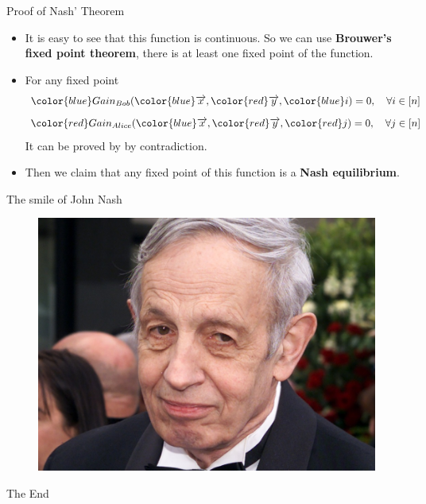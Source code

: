 \documentclass{beamer}
\begin{document}
\begin{frame}[fragile]{Proof of Nash' Theorem}
	\begin{itemize}[<+->]
		\item It is easy to see that this function is continuous. So we can use \textbf{Brouwer’s fixed point theorem}, there is at least one fixed point of the function.
		\item For any fixed point 
		\begin{equation}
		{\color{blue}Gain_{Bob}} ({\color{blue}\overrightarrow{x}}, {\color{red}\overrightarrow{y}}, {\color{blue}i}) = 0, \ \ \  \forall i\in [n] \nonumber
		\end{equation}
		\begin{equation}
		{\color{red}Gain_{Alice}} ({\color{blue}\overrightarrow{x}}, {\color{red}\overrightarrow{y}}, {\color{red}j}) = 0, \ \ \  \forall j\in [n]\nonumber
		\end{equation}
		It can be proved by by contradiction.
		\item Then we claim that any fixed point of this function is a \textbf{Nash equilibrium}.
	\end{itemize}
\end{frame}

\begin{frame}[fragile]{The smile of John Nash}
	\begin{figure}[H]
		\centering
		\includegraphics[width=0.7\linewidth]{002.jpeg}\vspace{-10pt}
		\nonumber\vspace{-10pt}
	\end{figure}
\end{frame}


\begin{frame}
\Huge{\centerline{The End}}
\end{frame}
\end{document}
